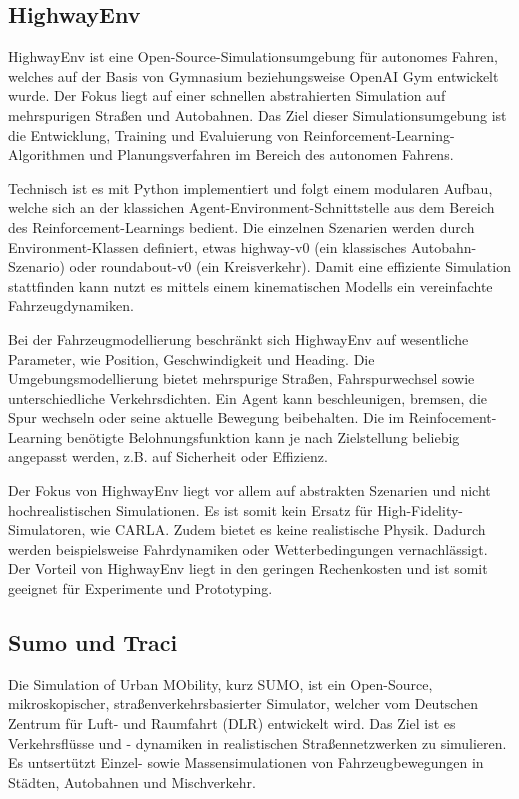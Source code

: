 \subsection{HighwayEnv}
HighwayEnv ist eine Open-Source-Simulationsumgebung für autonomes Fahren, welches auf der Basis von Gymnasium beziehungsweise OpenAI Gym entwickelt wurde. Der Fokus liegt auf einer schnellen abstrahierten Simulation auf mehrspurigen Straßen und Autobahnen. Das Ziel dieser Simulationsumgebung ist die Entwicklung, Training und Evaluierung von Reinforcement-Learning-Algorithmen und Planungsverfahren im Bereich des autonomen Fahrens.

Technisch ist es mit Python implementiert und folgt einem modularen Aufbau, welche sich an der klassichen Agent-Environment-Schnittstelle aus dem Bereich des Reinforcement-Learnings bedient. Die einzelnen Szenarien werden durch Environment-Klassen definiert, etwas highway-v0 (ein klassisches Autobahn-Szenario) oder roundabout-v0 (ein Kreisverkehr). Damit eine effiziente Simulation stattfinden kann nutzt es mittels einem kinematischen Modells ein vereinfachte Fahrzeugdynamiken.

Bei der Fahrzeugmodellierung beschränkt sich HighwayEnv auf wesentliche Parameter, wie Position, Geschwindigkeit und Heading. Die Umgebungsmodellierung bietet mehrspurige Straßen, Fahrspurwechsel sowie unterschiedliche Verkehrsdichten. Ein Agent kann beschleunigen, bremsen, die Spur wechseln oder seine aktuelle Bewegung beibehalten. Die im Reinfocement-Learning benötigte Belohnungsfunktion kann je nach Zielstellung beliebig angepasst werden, z.B. auf Sicherheit oder Effizienz. 

Der Fokus von HighwayEnv liegt vor allem auf abstrakten Szenarien und nicht hochrealistischen Simulationen. Es ist somit kein Ersatz für High-Fidelity-Simulatoren, wie CARLA. Zudem bietet es keine realistische Physik. Dadurch werden beispielsweise Fahrdynamiken oder Wetterbedingungen vernachlässigt. Der Vorteil von HighwayEnv liegt in den geringen Rechenkosten und ist somit geeignet für Experimente und Prototyping.
\subsection{Sumo und Traci}
Die Simulation of Urban MObility, kurz SUMO, ist ein Open-Source, mikroskopischer, straßenverkehrsbasierter Simulator, welcher vom Deutschen Zentrum für Luft- und Raumfahrt (DLR) entwickelt wird. Das Ziel ist es Verkehrsflüsse und - dynamiken in realistischen Straßennetzwerken zu simulieren. Es untsertützt Einzel- sowie Massensimulationen von Fahrzeugbewegungen in Städten, Autobahnen und Mischverkehr.

